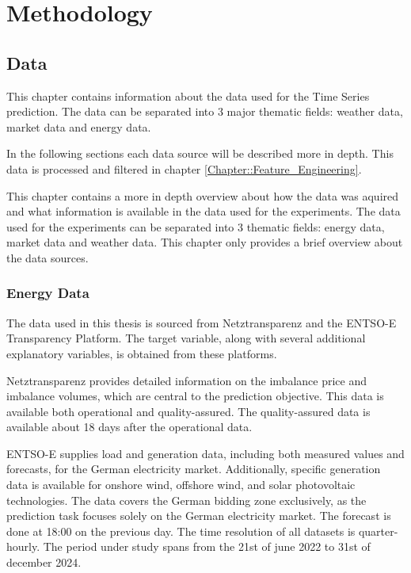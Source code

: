 \documentclass[class=scrbook, crop=false]{standalone}
\begin{document}
\chapter{Methodology} %
\label{Chapter::Methodology}

\section{Data}
\label{Chapter::Data}
This chapter contains information about the data used for the Time Series prediction. 
The data can be separated into 3 major thematic fields: weather data, market data and energy data.

In the following sections each data source will be described more in depth. 
This data is processed and filtered in chapter \ref{Chapter::Feature_Engineering}.

This chapter contains a more in depth overview about how the data was aquired and what information is available in the data used for the experiments. 
The data used for the experiments can be separated into 3 thematic fields: energy data, market data and weather data.
This chapter only provides a brief overview about the data sources. 


\subsection{Energy Data}
\label{Section::Energy_Data}


The data used in this thesis is sourced from Netztransparenz and the ENTSO-E Transparency Platform.
The target variable, along with several additional explanatory variables, is obtained from these platforms.

Netztransparenz provides detailed information on the imbalance price and imbalance volumes, which are central to the prediction objective.
This data is available both operational and quality-assured.
The quality-assured data is available about 18 days after the operational data. 

ENTSO-E supplies load and generation data, including both measured values and forecasts, for the German electricity market.
Additionally, specific generation data is available for onshore wind, offshore wind, and solar photovoltaic technologies.
The data covers the German bidding zone exclusively, as the prediction task focuses solely on the German electricity market.
The forecast is done at 18:00 on the previous day. 
The time resolution of all datasets is quarter-hourly.
The period under study spans from the 21st of june 2022 to 31st of december 2024.
\end{document}

